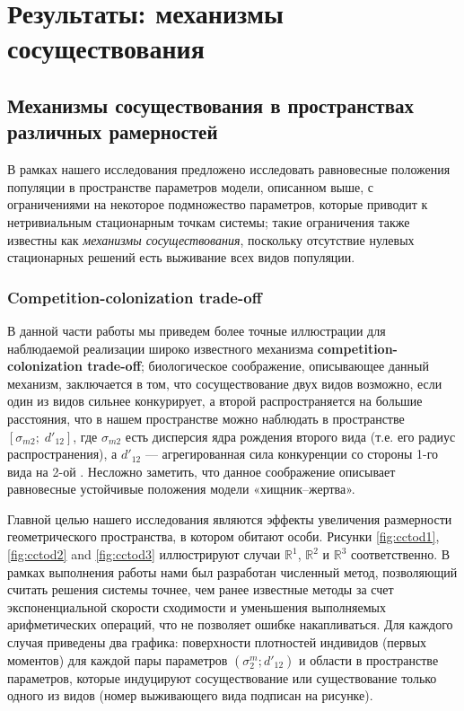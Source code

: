 \chapter{Результаты: механизмы сосуществования}

\section{Механизмы сосуществования в пространствах различных рамерностей}

В рамках нашего исследования предложено исследовать равновесные положения популяции в пространстве параметров модели, описанном выше, с ограничениями на некоторое подмножество параметров, которые приводит к нетривиальным стационарным точкам системы; такие ограничения также известны как \textit{механизмы сосуществования}, поскольку отсутствие нулевых стационарных решений есть выживание всех видов популяции.

\subsection{Competition-colonization trade-off}

В данной части работы мы приведем более точные иллюстрации для наблюдаемой реализации широко известного механизма \textbf{competition-colonization trade-off}; биологическое соображение, описывающее данный механизм, заключается в том, что сосуществование двух видов возможно, если один из видов сильнее конкурирует, а второй распространяется на большие расстояния, что в нашем пространстве можно наблюдать в пространстве $ \left[\sigma_{m2};\;d'_{12}\right] $, где $\sigma_{m2}$ есть дисперсия ядра рождения второго вида (т.е. его радиус распространения), а $d'_{12}$ --- агрегированная сила конкуренции со стороны 1-го вида на 2-ой . Несложно заметить, что данное соображение описывает равновесные устойчивые положения модели «хищник–жертва».

Главной целью нашего исследования являются эффекты увеличения размерности геометрического пространства, в котором обитают особи. Рисунки \ref{fig:cctod1}, \ref{fig:cctod2} and \ref{fig:cctod3} иллюстрируют случаи $ \mathbb{R}^{1} $, $ \mathbb{R}^{2} $ и $ \mathbb{R}^{3} $ соответственно. В рамках выполнения работы нами был разработан численный метод, позволяющий считать решения системы точнее, чем ранее известные методы за счет экспоненциальной скорости сходимости и уменьшения выполняемых арифметических операций, что не позволяет ошибке накапливаться. Для каждого случая приведены два графика: поверхности плотностей индивидов (первых моментов) для каждой пары параметров $ (\sigma_{2}^{m};d'_{12}) $ и области в пространстве параметров, которые индуцируют сосуществование или существование только одного из видов (номер выживающего вида подписан на рисунке).

